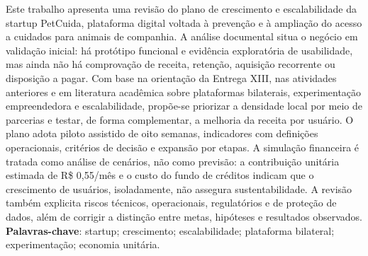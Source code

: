 \begin{resumo}[RESUMO]
Este trabalho apresenta uma revisão do plano de crescimento e escalabilidade da startup PetCuida, plataforma digital voltada à prevenção e à ampliação do acesso a cuidados para animais de companhia. A análise documental situa o negócio em validação inicial: há protótipo funcional e evidência exploratória de usabilidade, mas ainda não há comprovação de receita, retenção, aquisição recorrente ou disposição a pagar. Com base na orientação da Entrega XIII, nas atividades anteriores e em literatura acadêmica sobre plataformas bilaterais, experimentação empreendedora e escalabilidade, propõe-se priorizar a densidade local por meio de parcerias e testar, de forma complementar, a melhoria da receita por usuário. O plano adota piloto assistido de oito semanas, indicadores com definições operacionais, critérios de decisão e expansão por etapas. A simulação financeira é tratada como análise de cenários, não como previsão: a contribuição unitária estimada de R\$ 0,55/mês e o custo do fundo de créditos indicam que o crescimento de usuários, isoladamente, não assegura sustentabilidade. A revisão também explicita riscos técnicos, operacionais, regulatórios e de proteção de dados, além de corrigir a distinção entre metas, hipóteses e resultados observados.
\vspace{\onelineskip}
\noindent\textbf{Palavras-chave}: startup; crescimento; escalabilidade; plataforma bilateral; experimentação; economia unitária.
\end{resumo}